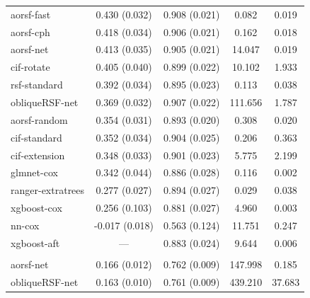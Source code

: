\documentclass{article}\usepackage[]{graphicx}\usepackage[]{xcolor}
\newenvironment{knitrout}{}{} %
\begin{document}
\begin{knitrout}
\begin{longtable}[t]{lcccc}
\hline
\hspace{1em}aorsf-fast & 0.430 (0.032) & 0.908 (0.021) & 0.082 & 0.019\\
\hspace{1em}aorsf-cph & 0.418 (0.034) & 0.906 (0.021) & 0.162 & 0.018\\
\hspace{1em}aorsf-net & 0.413 (0.035) & 0.905 (0.021) & 14.047 & 0.019\\
\hspace{1em}cif-rotate & 0.405 (0.040) & 0.899 (0.022) & 10.102 & 1.933\\
\hspace{1em}rsf-standard & 0.392 (0.034) & 0.895 (0.023) & 0.113 & 0.038\\
\hspace{1em}obliqueRSF-net & 0.369 (0.032) & 0.907 (0.022) & 111.656 & 1.787\\
\hspace{1em}aorsf-random & 0.354 (0.031) & 0.893 (0.020) & 0.308 & 0.020\\
\hspace{1em}cif-standard & 0.352 (0.034) & 0.904 (0.025) & 0.206 & 0.363\\
\hspace{1em}cif-extension & 0.348 (0.033) & 0.901 (0.023) & 5.775 & 2.199\\
\hspace{1em}glmnet-cox & 0.342 (0.044) & 0.886 (0.028) & 0.116 & 0.002\\
\hspace{1em}ranger-extratrees & 0.277 (0.027) & 0.894 (0.027) & 0.029 & 0.038\\
\hspace{1em}xgboost-cox & 0.256 (0.103) & 0.881 (0.027) & 4.960 & 0.003\\
\hspace{1em}nn-cox & -0.017 (0.018) & 0.563 (0.124) & 11.751 & 0.247\\
\hspace{1em}xgboost-aft & --- & 0.883 (0.024) & 9.644 & 0.006\\
\addlinespace[0.3em]
\multicolumn{5}{l}{\textit{\textbf{Rotterdam tumor bank; death, n = 2982, p = 11}}}\\
\hline
\hspace{1em}aorsf-net & 0.166 (0.012) & 0.762 (0.009) & 147.998 & 0.185\\
\hspace{1em}obliqueRSF-net & 0.163 (0.010) & 0.761 (0.009) & 439.210 & 37.683\\

\end{longtable}
\end{knitrout}
\end{document}

